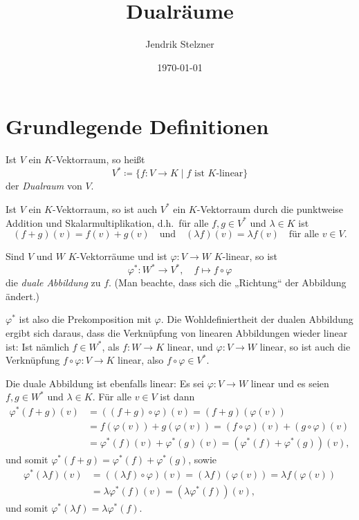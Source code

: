 \documentclass[a4paper,10pt]{article}
\title{Dualräume}
\author{Jendrik Stelzner}
\date{\today}
\begin{document}
\maketitle

\tableofcontents










\section{Grundlegende Definitionen}

\begin{defi}
 Ist $V$ ein $K$-Vektorraum, so heißt
 \[
  V^* \coloneqq \{f \colon V \to K \mid \text{$f$ ist $K$-linear}\}
 \]
 der \emph{Dualraum} von $V$.
\end{defi}

Ist $V$ ein $K$-Vektorraum, so ist auch $V^*$ ein $K$-Vektorraum durch die punktweise Addition und Skalarmultiplikation, d.h.\ für alle $f,g \in V^*$ und $\lambda \in K$ ist
\[
 (f+g)(v) = f(v) + g(v)
 \quad\text{und}\quad
 (\lambda f)(v) = \lambda f(v)
 \quad \text{für alle $v \in V$}.
\]

\begin{defi}
 Sind $V$ und $W$ $K$-Vektorräume und ist $\varphi \colon V \to W$ $K$-linear, so ist
 \[
  \varphi^* \colon W^* \to V^*, \quad f \mapsto f \circ \varphi
 \]
 die \emph{duale Abbildung} zu $f$. (Man beachte, dass sich die „Richtung“ der Abbildung ändert.)
\end{defi}

$\varphi^*$ ist also die Prekomposition mit $\varphi$. Die Wohldefiniertheit der dualen Abbildung ergibt sich daraus, dass die Verknüpfung von linearen Abbildungen wieder linear ist: Ist nämlich $f \in W^*$, als $f \colon W \to K$ linear, und $\varphi \colon V \to W$ linear, so ist auch die Verknüpfung $f \circ \varphi \colon V \to K$ linear, also $f \circ \varphi \in V^*$.

Die duale Abbildung ist ebenfalls linear: Es sei $\varphi \colon V \to W$ linear und es seien $f,g \in W^*$ und $\lambda \in K$. Für alle $v \in V$ ist dann
\begin{align*}
 \varphi^*(f+g)(v)
 &= ((f+g) \circ \varphi)(v)
 = (f+g)(\varphi(v)) \\
 &= f(\varphi(v)) + g(\varphi(v))
 = (f \circ \varphi)(v) + (g \circ \varphi)(v) \\
 &= \varphi^*(f)(v) + \varphi^*(g)(v)
 = (\varphi^*(f)+\varphi^*(g))(v),
\end{align*}
und somit $\varphi^*(f+g) = \varphi^*(f) + \varphi^*(g)$, sowie
\begin{align*}
 \varphi^*(\lambda f)(v)
 &= ((\lambda f) \circ \varphi)(v)
 = (\lambda f)(\varphi(v))
 = \lambda f(\varphi(v)) \\
 &= \lambda \varphi^*(f)(v)
 = (\lambda \varphi^*(f))(v),
\end{align*}
und somit $\varphi^*(\lambda f) =  \lambda \varphi^*(f)$.
\end{document}
